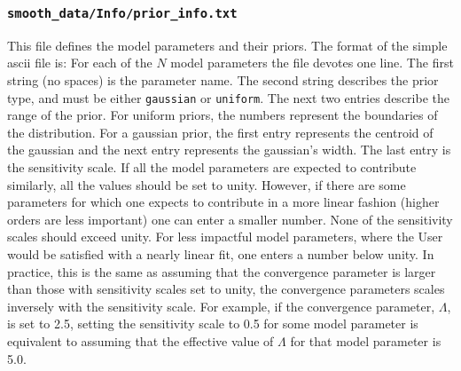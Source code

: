 \documentclass[UserManual.tex]{subfiles}
\begin{document}
\subsubsection{{\tt smooth\_data/Info/prior\_info.txt}}
This file defines the model parameters and their priors. The format of the simple ascii file is:
\vspace*{-8pt}{\tt \begin{Verbatim}[commandchars=\\\{\}]
parameter_name_1  prior_type_1 xmin_1/centroid_1  xmax_1/Rgauss_1  sensivity_scale_1
parameter_name_2  prior_type_2 xmin_2/centroid_2  xmin_2/Rgauss_2  sensivity_scale_2
   .
parameter_name_N  prior_type_N xmin_N/centroid_N  xmin_N/Rgauss_N  sensivity_scale_N
\end{Verbatim}
}\vspace*{-8pt}
For each of the $N$ model parameters the file devotes one line. The first string (no spaces) is the parameter name. The second string describes the prior type, and must be either {\tt gaussian} or {\tt uniform}. The next two entries describe the range of the prior. For uniform priors, the numbers represent the boundaries of the distribution. For a gaussian prior, the first entry represents the centroid of the gaussian and the next entry  represents the gaussian's width. The last entry is the sensitivity scale. If all the model parameters are expected to contribute similarly, all the values should be set to unity. However, if there are some parameters for which one expects to contribute in a more linear fashion (higher orders are less important) one can enter a smaller number. None of the sensitivity scales should exceed unity. For less impactful model parameters, where the User would be satisfied with a nearly linear fit, one enters a number below unity. In practice, this is the same as assuming that the convergence parameter is larger than those with sensitivity scales set to unity, the convergence parameters scales inversely with the sensitivity scale. For example, if the convergence parameter, $\Lambda$, is set to 2.5, setting the sensitivity scale to 0.5 for some model parameter is equivalent to assuming that the effective value of $\Lambda$ for that model parameter is 5.0. 
\end{document}
